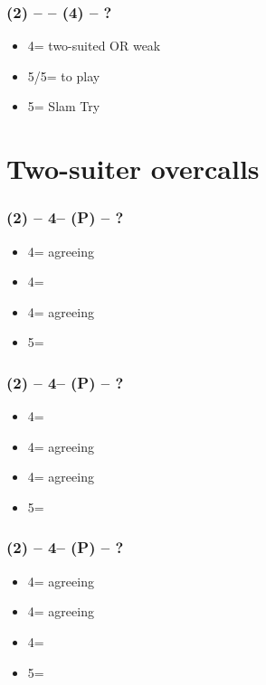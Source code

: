 \subsubsection*{(2\spades) -- \dbl -- (4\spades) -- ?}
\begin{itemize}
    \item 4\nt = two-suited OR weak \hearts
    \item 5\clubs/5\diams = to play
    \item 5\hearts = Slam Try
\end{itemize}

\section{\texorpdfstring{Two-suiter overcalls}{twoSuitAgreeing}}\label{sec:twoSuitAgreeing}

\subsubsection*{(2\spades) -- 4\clubs -- (P) -- ?}
\begin{itemize}
    \item 4\diams = agreeing \hearts
    \item 4\hearts = \soff
    \item 4\spades = agreeing \clubs
    \item 5\clubs = \soff
\end{itemize}

\subsubsection*{(2\spades) -- 4\diams -- (P) -- ?}
\begin{itemize}
    \item 4\hearts = \soff
    \item 4\spades = agreeing \diams
    \item 4\nt = agreeing \hearts
    \item 5\diams = \soff
\end{itemize}

\subsubsection*{(2\hearts) -- 4\clubs -- (P) -- ?}
\begin{itemize}
    \item 4\diams = agreeing \spades
    \item 4\hearts = agreeing \clubs
    \item 4\spades = \soff
    \item 5\clubs = \soff
\end{itemize}

